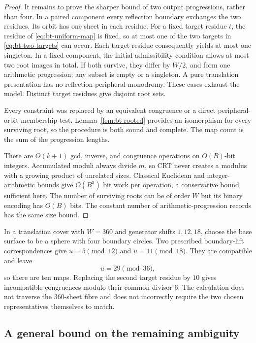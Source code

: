 \begin{proof}
It remains to prove the sharper bound of two output progressions, rather
than four.  In a paired component every reflection boundary exchanges the
two residues.  Its orbit has one sheet in each residue.  For a fixed target
residue $t$, the residue of \eqref{eq:bt-uniform-map} is fixed, so at most
one of the two targets in \eqref{eq:bt-two-targets} can occur.  Each target
residue consequently yields at most one singleton.  In a fixed component,
the initial admissibility condition allows at most two root images in
total.  If both survive, they differ by $W/2$, and form one arithmetic
progression; any subset is empty or a singleton.  A pure translation
presentation has no reflection peripheral monodromy.  These cases exhaust
the model.  Distinct target residues give disjoint root sets.

Every constraint was replaced by an equivalent congruence or a direct
peripheral-orbit membership test.  Lemma~\ref{lem:bt-rooted} provides an
isomorphism for every surviving root, so the procedure is both sound and
complete.  The map count is the sum of the progression lengths.

There are $O(k+1)$ gcd, inverse, and congruence operations on $O(B)$-bit
integers.  Accumulated moduli always divide $m$, so CRT never creates a
modulus with a growing product of unrelated sizes.  Classical Euclidean
and integer-arithmetic bounds give $O(B^3)$ bit work per operation, a
conservative bound sufficient here.  The number of surviving roots can
be of order $W$ but its binary encoding has $O(B)$ bits.  The constant
number of arithmetic-progression records has the same size bound.
\end{proof}

\begin{example}
In a translation cover with $W=360$ and generator shifts $1,12,18$, choose
the base surface to be a sphere with four boundary circles.  Two prescribed
boundary-lift correspondences give
$u=5\pmod{12}$ and $u=11\pmod{18}$.  They are compatible and leave
\[
 u=29\pmod{36},
\]
so there are ten maps.  Replacing the second target residue by $10$ gives
incompatible congruences modulo their common divisor $6$.  The calculation
does not traverse the $360$-sheet fibre and does not incorrectly require
the two chosen representatives themselves to match.
\end{example}

\subsection{A general bound on the remaining ambiguity}

